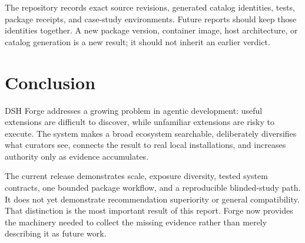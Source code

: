 \documentclass[10pt,twocolumn]{article}
\begin{document}
The repository records exact source revisions, generated catalog identities, tests, package receipts, and case-study environments. Future reports should keep those identities together. A new package version, container image, host architecture, or catalog generation is a new result; it should not inherit an earlier verdict.

\section{Conclusion}

DSH Forge addresses a growing problem in agentic development: useful extensions are difficult to discover, while unfamiliar extensions are risky to execute. The system makes a broad ecosystem searchable, deliberately diversifies what curators see, connects the result to real local installations, and increases authority only as evidence accumulates.

The current release demonstrates scale, exposure diversity, tested system contracts, one bounded package workflow, and a reproducible blinded-study path. It does not yet demonstrate recommendation superiority or general compatibility. That distinction is the most important result of this report. Forge now provides the machinery needed to collect the missing evidence rather than merely describing it as future work.

\footnotesize


\end{document}
